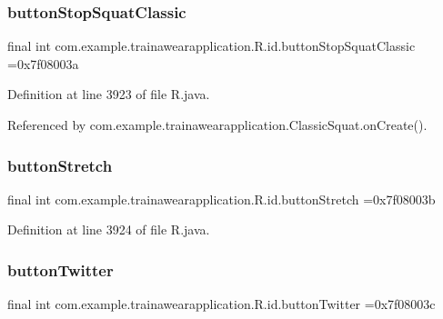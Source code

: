 \subsubsection{\texorpdfstring{buttonStopSquatClassic}{buttonStopSquatClassic}}
{\footnotesize\ttfamily final int com.\+example.\+trainawearapplication.\+R.\+id.\+button\+Stop\+Squat\+Classic =0x7f08003a\hspace{0.3cm}{\ttfamily [static]}}



Definition at line 3923 of file R.\+java.



Referenced by com.\+example.\+trainawearapplication.\+Classic\+Squat.\+on\+Create().

\mbox{\label{classcom_1_1example_1_1trainawearapplication_1_1_r_1_1id_ab4a58234dde61ddb48cd3f2f90d34775}} 
\subsubsection{\texorpdfstring{buttonStretch}{buttonStretch}}
{\footnotesize\ttfamily final int com.\+example.\+trainawearapplication.\+R.\+id.\+button\+Stretch =0x7f08003b\hspace{0.3cm}{\ttfamily [static]}}



Definition at line 3924 of file R.\+java.

\mbox{\label{classcom_1_1example_1_1trainawearapplication_1_1_r_1_1id_a4575a50167e8e79b0390c94bf121ee35}} 
\subsubsection{\texorpdfstring{buttonTwitter}{buttonTwitter}}
{\footnotesize\ttfamily final int com.\+example.\+trainawearapplication.\+R.\+id.\+button\+Twitter =0x7f08003c\hspace{0.3cm}{\ttfamily [static]}}



